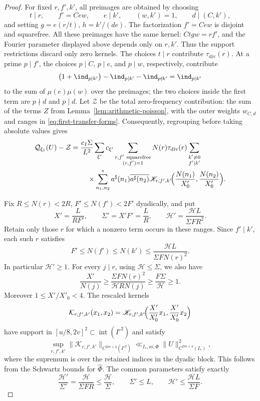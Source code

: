 \begin{proof}
For fixed $r,f',k'$, all preimages are obtained by choosing
\[
 t\mid r,\qquad f'=Cew,\qquad e\mid k',\qquad
 (w,k')=1,\qquad d\mid(C,k'),
\]
and setting $g=e(r/t)$, $h=k'/(de)$.
The factorization $f'=Cew$ is disjoint and squarefree.
All these preimages have the same kernel: $Ctgw=rf'$, and the
Fourier parameter displayed above depends only on $r,k'$.
Thus the support restrictions discard only zero kernels.
The choices $t\mid r$ contribute $\tau_{\mathrm{div}}(r)$.
At a prime $p\mid f'$, the choices $p\mid C$, $p\mid e$, and
$p\mid w$, respectively, contribute
\[
 \bigl(1+\ind_{p\mid k'}\bigr)
       -\ind_{p\mid k'}-\ind_{p\nmid k'}=\ind_{p\mid k'}
\]
to the sum of $\mu(e)\mu(w)$ over the preimages; the two choices
inside the first term are $p\nmid d$ and $p\mid d$.
Let $\mathcal Z$ be the total zero-frequency contribution: the sum of the terms $Z$ from Lemma~\ref{lem:arithmetic-poisson}, with the outer weights $w_{C,d}$ and ranges in \eqref{eq:first-transfer-forms}.
Consequently, regrouping before taking absolute values gives
\[
 \begin{aligned}
 \mathcal Q_{\xi_1}(U)-\mathcal Z
 ={}&\frac{c_I\Sigma}{L^2}
 \sum_{\xi'}c_{\xi'}
 \sum_{\substack{r,f'\ \mathrm{squarefree}\\(r,f')=1}}
 N(r)\tau_{\mathrm{div}}(r)\sum_{\substack{k'\ne0\\f'\mid k'}}\\
 &\quad\times
 \sum_{n_1,n_2}^*a^\sharp(n_1)\overline{a^\sharp(n_2)}
 \mathscr K_{r,f',k'}\!\Bigl(\frac{N(n_1)}{X'_0},
                            \frac{N(n_2)}{X'_0}\Bigr).
 \end{aligned}
\]

Fix $R\le N(r)<2R$, $F'\le N(f')<2F'$ dyadically, and put
\[
 X'=\frac L{RF'},\qquad \Sigma'=X'F'=\frac LR,\qquad
 \mathcal H'=\frac{\mathcal H L}{\Sigma F R^2}.
\]
Retain only those $r$ for which a nonzero term occurs in these ranges.
Since $f'\mid k'$, each such $r$ satisfies
\[
 F'\le N(f')\le N(k')\le
 \frac{\mathcal H L}{\Sigma F N(r)^2}.
\]
In particular $\mathcal H'\ge1$. For every $j\mid r$, using $\mathcal H\le\Sigma$, we also have
\begin{equation}\label{eq:child-column-lower-bound}
 \frac{X'}{N(j)}
 \ge\frac{\Sigma F N(r)^2}{\mathcal H R N(j)}
 \ge\frac{F\Sigma}{\mathcal H}\ge1.
\end{equation}
Moreover $1\le X'/X'_0<4$. The rescaled kernels
\[
 \mathcal K_{r,f',k'}(x_1,x_2)
 =\mathscr K_{r,f',k'}\!\Bigl(\frac{X'}{X'_0}x_1,
                              \frac{X'}{X'_0}x_2\Bigr)
\]
have support in $[u/8,2v]^2\subset\operatorname{int}(I'^2)$ and satisfy
\[
 \sup_{r,f',k'}\|\mathcal K_{r,f',k'}\|_{C^{2m+4}(I'^2)}
 \ll_{I_*,m,\Phi}\|U\|_{C^{2m+4}(I_*)}^2,
\]
where the supremum is over the retained indices in the dyadic block.
This follows from the Schwartz bounds for $\widehat\Phi$.
The common parameters satisfy exactly
\[
 \frac{\mathcal H'}{\Sigma'}=
 \frac{\mathcal H}{\Sigma FR}\le\frac{\mathcal H}{\Sigma},\qquad
 \Sigma'\le L,\qquad
 \mathcal H'\le\frac{\mathcal H L}{\Sigma F}.
\]


\end{proof}
